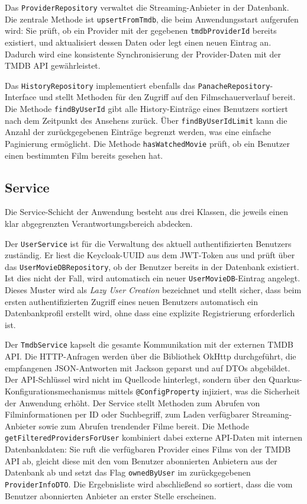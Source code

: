 Das \texttt{ProviderRepository} verwaltet die Streaming-Anbieter in der
Datenbank. Die zentrale Methode ist \texttt{upsertFromTmdb}, die beim
Anwendungsstart aufgerufen wird: Sie prüft, ob ein Provider mit der
gegebenen \texttt{tmdbProviderId} bereits existiert, und aktualisiert
dessen Daten oder legt einen neuen Eintrag an. Dadurch wird eine konsistente
Synchronisierung der Provider-Daten mit der TMDB API gewährleistet.

Das \texttt{HistoryRepository} implementiert ebenfalls das
\texttt{PanacheRepository}-Interface und stellt Methoden für den Zugriff
auf den Filmschauerverlauf bereit. Die Methode \texttt{findByUserId} gibt
alle History-Einträge eines Benutzers sortiert nach dem Zeitpunkt des
Ansehens zurück. Über \texttt{findByUserIdLimit} kann die Anzahl der
zurückgegebenen Einträge begrenzt werden, was eine einfache Paginierung
ermöglicht. Die Methode \texttt{hasWatchedMovie} prüft, ob ein Benutzer
einen bestimmten Film bereits gesehen hat.

\subsection{Service}

Die Service-Schicht der Anwendung besteht aus drei Klassen, die jeweils
einen klar abgegrenzten Verantwortungsbereich abdecken.

Der \texttt{UserService} ist für die Verwaltung des aktuell authentifizierten
Benutzers zuständig. Er liest die Keycloak-UUID aus dem JWT-Token aus und
prüft über das \texttt{UserMovieDBRepository}, ob der Benutzer bereits in
der Datenbank existiert. Ist dies nicht der Fall, wird automatisch ein neuer
\texttt{UserMovieDB}-Eintrag angelegt. Dieses Muster wird als
\textit{Lazy User Creation} bezeichnet und stellt sicher, dass beim ersten
authentifizierten Zugriff eines neuen Benutzers automatisch ein
Datenbankprofil erstellt wird, ohne dass eine explizite Registrierung
erforderlich ist.

Der \texttt{TmdbService} kapselt die gesamte Kommunikation mit der externen
TMDB API. Die HTTP-Anfragen werden über die Bibliothek OkHttp durchgeführt,
die empfangenen JSON-Antworten mit Jackson geparst und auf DTOs abgebildet.
Der API-Schlüssel wird nicht im Quellcode hinterlegt, sondern über den
Quarkus-Konfigurationsmechanismus mittels \texttt{@ConfigProperty} injiziert,
was die Sicherheit der Anwendung erhöht. Der Service stellt Methoden zum
Abrufen von Filminformationen per ID oder Suchbegriff, zum Laden verfügbarer
Streaming-Anbieter sowie zum Abrufen trendender Filme bereit. Die Methode
\texttt{getFilteredProvidersForUser} kombiniert dabei externe API-Daten mit
internen Datenbankdaten: Sie ruft die verfügbaren Provider eines Films von
der TMDB API ab, gleicht diese mit den vom Benutzer abonnierten Anbietern
aus der Datenbank ab und setzt das Flag \texttt{ownedByUser} im
zurückgegebenen \texttt{ProviderInfoDTO}. Die Ergebnisliste wird abschließend
so sortiert, dass die vom Benutzer abonnierten Anbieter an erster Stelle
erscheinen.

